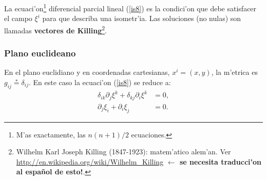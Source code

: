 La ecuaci'on\footnote{M'as exactamente, las $n(n+1)/2$ ecuaciones.} diferencial parcial lineal (\ref{is8}) es la condici'on que debe satisfacer el campo $\xi^i$ para que describa una isometr'ia. Las soluciones (no nulas) son llamadas \textbf{vectores de Killing}\footnote{Wilhelm Karl Joseph Killing (1847-1923): matem'atico alem'an. Ver \url{http://en.wikipedia.org/wiki/Wilhelm_Killing}  \textbf{$\leftarrow$ se necesita traducci'on al espa\~nol de esto!}.}.

\subsubsection{Plano euclideano}

En el plano euclidiano y en coordenadas cartesianas, $x^i=(x,y)$, la
m'etrica es $g_{ij}\overset{\ast}{=}\delta_{ij}$.
%
En este caso la ecuaci'on (\ref{is8}) se reduce a:
\begin{align}
\delta_{ik}\partial_j\xi^k+\delta_{kj}\partial_i\xi^k  &  =0,\label{isej1}\\
\partial_j\xi_i+\partial_i\xi_j  &  =0. \nonumber
\end{align}

